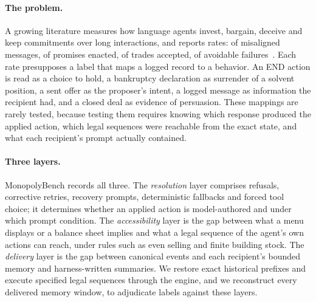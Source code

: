 \paragraph{The problem.}
A growing literature measures how language agents invest, bargain, deceive and keep
commitments over long interactions, and reports rates: of misaligned messages, of promises
enacted, of trades accepted, of avoidable failures~\cite{li2026arena,wu2026agentmonopoly,hu2026finboardbench}.
Each rate presupposes a label that maps a logged record to a behavior. An END action is
read as a choice to hold, a bankruptcy declaration as surrender of a solvent position, a
sent offer as the proposer's intent, a logged message as information the recipient
had, and a closed deal as evidence of persuasion. These mappings are rarely tested,
because testing them requires knowing which response produced the applied action, which
legal sequences were reachable from the exact state, and what each recipient's prompt
actually contained.

\paragraph{Three layers.}
MonopolyBench records all three. The \emph{resolution} layer comprises refusals,
corrective retries, recovery prompts, deterministic fallbacks and forced tool choice; it
determines whether an applied action is model-authored and under which prompt condition.
The \emph{accessibility} layer is the gap between what a menu displays or a balance sheet
implies and what a legal sequence of the agent's own actions can reach, under rules such
as even selling and finite building stock. The \emph{delivery} layer is the gap between
canonical events and each recipient's bounded memory and harness-written summaries. We
restore exact historical prefixes and execute specified legal sequences through the
engine, and we reconstruct every delivered memory window, to adjudicate labels against
these layers.

